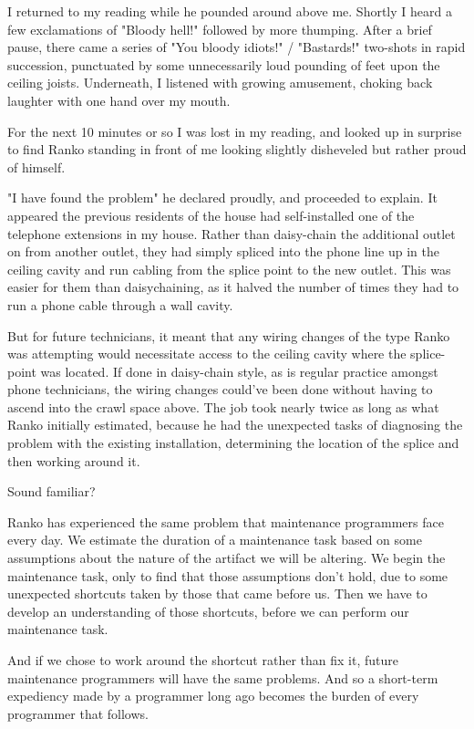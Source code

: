 \documentclass{article}
\begin{document}
I returned to my reading while he pounded around above me. Shortly I
heard a few exclamations of "Bloody hell!" followed by more thumping.
After a brief pause, there came a series of "You bloody idiots!" /
"Bastards!" two-shots in rapid succession, punctuated by some
unnecessarily loud pounding of feet upon the ceiling joists. Underneath,
I listened with growing amusement, choking back laughter with one hand
over my mouth.

For the next 10 minutes or so I was lost in my reading, and looked up in
surprise to find Ranko standing in front of me looking slightly
disheveled but rather proud of himself.

"I have found the problem" he declared proudly, and proceeded to
explain. It appeared the previous residents of the house had
self-installed one of the telephone extensions in my house. Rather than
daisy-chain the additional outlet on from another outlet, they had
simply spliced into the phone line up in the ceiling cavity and run
cabling from the splice point to the new outlet. This was easier for
them than daisychaining, as it halved the number of times they had to
run a phone cable through a wall cavity.

But for future technicians, it meant that any wiring changes of the type
Ranko was attempting would necessitate access to the ceiling cavity
where the splice-point was located. If done in daisy-chain style, as is
regular practice amongst phone technicians, the wiring changes could've
been done without having to ascend into the crawl space above. The job
took nearly twice as long as what Ranko initially estimated, because he
had the unexpected tasks of diagnosing the problem with the existing
installation, determining the location of the splice and then working
around it.

Sound familiar?

Ranko has experienced the same problem that maintenance programmers face
every day. We estimate the duration of a maintenance task based on some
assumptions about the nature of the artifact we will be altering. We
begin the maintenance task, only to find that those assumptions don't
hold, due to some unexpected shortcuts taken by those that came before
us. Then we have to develop an understanding of those shortcuts, before
we can perform our maintenance task.

And if we chose to work around the shortcut rather than fix it, future
maintenance programmers will have the same problems. And so a short-term
expediency made by a programmer long ago becomes the burden of every
programmer that follows.
\end{document}
